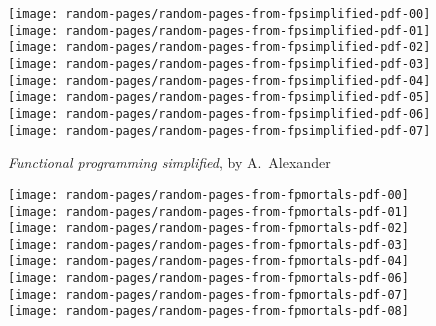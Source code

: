 \begin{figure}
\begin{centering}
\texttt{[image: random-pages/random-pages-from-fpsimplified-pdf-00]}\texttt{[image: random-pages/random-pages-from-fpsimplified-pdf-01]}\texttt{[image: random-pages/random-pages-from-fpsimplified-pdf-02]}\texttt{[image: random-pages/random-pages-from-fpsimplified-pdf-03]}\texttt{[image: random-pages/random-pages-from-fpsimplified-pdf-04]}\texttt{[image: random-pages/random-pages-from-fpsimplified-pdf-05]}\texttt{[image: random-pages/random-pages-from-fpsimplified-pdf-06]}\texttt{[image: random-pages/random-pages-from-fpsimplified-pdf-07]}
\par\end{centering}
\begin{centering}
\vspace{-0.3\baselineskip}
\par\end{centering}
\begin{centering}
\emph{Functional programming simplified}, by A.~Alexander
\par\end{centering}
\begin{centering}
\vspace{1\baselineskip}
\par\end{centering}
\begin{centering}
\texttt{[image: random-pages/random-pages-from-fpmortals-pdf-00]}\texttt{[image: random-pages/random-pages-from-fpmortals-pdf-01]}\texttt{[image: random-pages/random-pages-from-fpmortals-pdf-02]}\texttt{[image: random-pages/random-pages-from-fpmortals-pdf-03]}\texttt{[image: random-pages/random-pages-from-fpmortals-pdf-04]}\texttt{[image: random-pages/random-pages-from-fpmortals-pdf-06]}\texttt{[image: random-pages/random-pages-from-fpmortals-pdf-07]}\texttt{[image: random-pages/random-pages-from-fpmortals-pdf-08]}
\par\end{centering}
\begin{centering}
\emph{\vspace{-1.6\baselineskip}
}
\par\end{centering}
\begin{centering}

\end{centering}
\end{figure}
